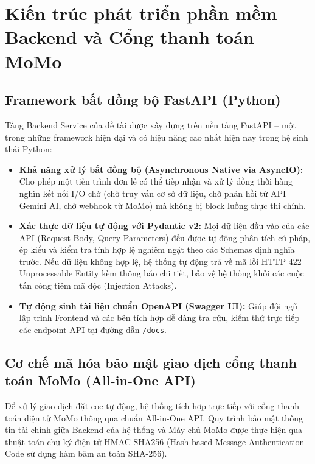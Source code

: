 \section{Kiến trúc phát triển phần mềm Backend và Cổng thanh toán MoMo}
\label{sec:congnghe_backend_momo}

\subsection{Framework bất đồng bộ FastAPI (Python)}
Tầng Backend Service của đề tài được xây dựng trên nền tảng FastAPI -- một trong những framework hiện đại và có hiệu năng cao nhất hiện nay trong hệ sinh thái Python:
\begin{itemize}[leftmargin=1.5cm]
    \item \textbf{Khả năng xử lý bất đồng bộ (Asynchronous Native via AsyncIO):} Cho phép một tiến trình đơn lẻ có thể tiếp nhận và xử lý đồng thời hàng nghìn kết nối I/O chờ (chờ truy vấn cơ sở dữ liệu, chờ phản hồi từ API Gemini AI, chờ webhook từ MoMo) mà không bị block luồng thực thi chính.
    \item \textbf{Xác thực dữ liệu tự động với Pydantic v2:} Mọi dữ liệu đầu vào của các API (Request Body, Query Parameters) đều được tự động phân tích cú pháp, ép kiểu và kiểm tra tính hợp lệ nghiêm ngặt theo các Schemas định nghĩa trước. Nếu dữ liệu không hợp lệ, hệ thống tự động trả về mã lỗi HTTP 422 Unprocessable Entity kèm thông báo chi tiết, bảo vệ hệ thống khỏi các cuộc tấn công tiêm mã độc (Injection Attacks).
    \item \textbf{Tự động sinh tài liệu chuẩn OpenAPI (Swagger UI):} Giúp đội ngũ lập trình Frontend và các bên tích hợp dễ dàng tra cứu, kiểm thử trực tiếp các endpoint API tại đường dẫn \texttt{/docs}.
\end{itemize}

\subsection{Cơ chế mã hóa bảo mật giao dịch cổng thanh toán MoMo (All-in-One API)}
Để xử lý giao dịch đặt cọc tự động, hệ thống tích hợp trực tiếp với cổng thanh toán điện tử MoMo thông qua chuẩn All-in-One API. Quy trình bảo mật thông tin tài chính giữa Backend của hệ thống và Máy chủ MoMo được thực hiện qua thuật toán chữ ký điện tử HMAC-SHA256 (Hash-based Message Authentication Code sử dụng hàm băm an toàn SHA-256).

